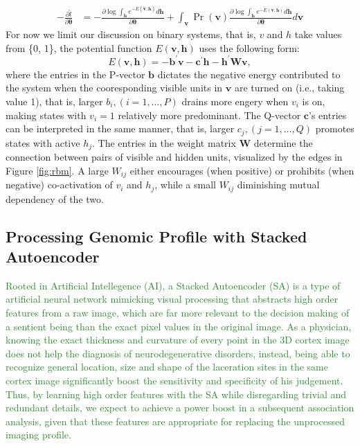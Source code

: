 \documentclass[11pt]{article}
\newcommand{\bs}{\boldsymbol}
\newcommand{\vb}{\boldsymbol{b}}
\newcommand{\vc}{\boldsymbol{c}}
\newcommand{\vh}{\boldsymbol{h}}
\newcommand{\vv}{\boldsymbol{v}}
\newcommand{\mW}{\boldsymbol{W}}
\newcommand{\vvt}{\tilde{\vv}}
\newcommand{\xacc}[1]{\textcolor{ForestGreen}{#1}}
\newcommand{\pEC}{\boldsymbol{\theta}}
\newcommand{\PDV}[2]{\frac{\partial #1}{\partial #2}}
\begin{document}
\begin{equation}\label{eq:grad}
  \begin{split}
    -\PDV{\tilde{l}}{\pEC} &= -\PDV{\log{\int_{\vh}{e^{-E(\vvt, \vh)}d\vh}}}{\pEC}
    +\int_{\vv}
    {
      \Pr(\vv) \PDV
      {
        \log
        {
          \int_{\vh} {e^{-E(\vv, \vh)}} {d\vh}
        }
      }{\pEC}
    }{d\vv}
  \end{split}
\end{equation}
For now we limit our discussion on binary systems, that is, $v$ and $h$ take values from \{0, 1\}, the potential function $E(\vv, \vh)$ uses the following form:
\begin{equation} \label{eq:energy}
  E(\vv, \vh) = -\vb^\prime \vv - \vc^\prime \vh - \vh^\prime \mW \vv,
\end{equation}
where the entries in the P-vector $\vb$ dictates the negative energy contributed to the system when the cooresponding visible units in $\vv$ are turned on (i.e., taking value 1), that is, larger $b_i, (i=1, \dots, P)$ drains more engery when $v_i$ is on, making states with $v_i=1$ relatively more predominant. The Q-vector $\bs{c}$'s entries can be interpreted in the same manner, that is, larger $c_j, (j=1, \dots, Q)$ promotes states with active $h_j$. The entries in the weight matrix $\mW$ determine the connection between pairs of visible and hidden units, visualized by the edges in Figure \ref{fig:rbm}. A large $W_{ij}$ either encourages (when positive) or prohibits (when negative) co-activation of $v_i$ and $h_j$, while a small $W_{ij}$ diminishing mutual dependency of the two.

\subsection*{Processing Genomic Profile with Stacked Autoencoder}
\xacc{Rooted in Artificial Intellegence (AI), a Stacked Autoencoder (SA) is a type of artificial neural network mimicking visual processing that abstracts high order features from a raw image, which are far more relevant to the decision making of a sentient being than the exact pixel values in the original image. As a physician, knowing the exact thickness and curvature of every point in the 3D cortex image does not help the diagnosis of neurodegenerative disorders, instead, being able to recognize general location, size and shape of the laceration sites in the same cortex image significantly boost the sensitivity and specificity of his judgement. Thus, by learning high order features with the SA while disregarding trivial and redundant details, we expect to achieve a power boost in a subsequent association analysis, given that these features are appropriate for replacing the unprocessed imaging profile.}
\end{document}
